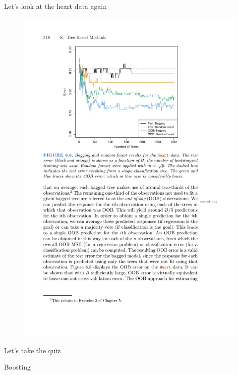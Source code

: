 \documentclass[mathserif, aspectratio=169]{beamer}
\begin{document}
\begin{frame}{Let's look at the heart data again}

\begin{figure}
\includegraphics[height=0.85\textheight]{islr88.pdf}
\caption*{}
\end{figure}
\end{frame}

\begin{frame}{}
Let's take the quiz
\end{frame}

\begin{frame}{}
\LARGE
\begin{center}
Boosting
\end{center}
\end{frame}
\end{document}

